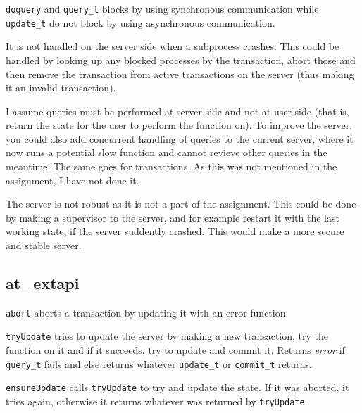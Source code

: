 \documentclass[a4paper, 10pt]{article}
\begin{document}
\texttt{doquery} and \texttt{query\_t} blocks by using synchronous communication while \texttt{update\_t} do not block by using asynchronous communication.

It is not handled on the server side when a subprocess crashes. This could be handled by looking up any blocked processes by the transaction, abort those and then remove the transaction from active transactions on the server (thus making it an invalid transaction).

I assume queries must be performed at server-side and not at user-side (that is, return the state for the user to perform the function on).
To improve the server, you could also add concurrent handling of queries to the current server, where it now runs a potential slow function and cannot revieve other queries in the meantime. The same goes for transactions. As this was not mentioned in the assignment, I have not done it.

The server is not robust as it is not a part of the assignment. This could be done by making a supervisor to the server, and for example restart it with the last working state, if the server suddently crashed. This would make a more secure and stable server.

\subsection{at\_extapi}
\texttt{abort} aborts a transaction by updating it with an error function.

\texttt{tryUpdate} tries to update the server by making a new transaction, try the function on it and if it succeeds, try to update and commit it. Returns \textit{error} if \texttt{query\_t} fails and else returns whatever \texttt{update\_t} or \texttt{commit\_t} returns.

\texttt{ensureUpdate} calls \texttt{tryUpdate} to try and update the state. If it was aborted, it tries again, otherwise it returns whatever was returned by \texttt{tryUpdate}.
\end{document}
